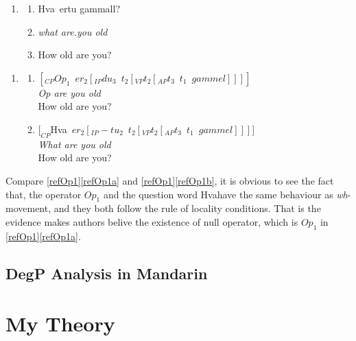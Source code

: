 \documentclass{ctexart}
\begin{document}
\begin{enumerate}[resume]
\item \label{refHva}
\begin{enumerate}
\item Hva\dh$\enspace$ertu gammall? 
\item \textit{what are.you old}
\item How old are you?
\end{enumerate}
\end{enumerate}

\begin{enumerate}[resume]
\item \label{refOp1}
\begin{enumerate}
\item \label{refOp1a} $[_{CP}Op_1 \enspace er_2[_{IP} du_3 \enspace t_2 [_{VP} t_2[_{AP} t_3 \enspace t_1 \enspace gammel]]]]$ \\
\textit{Op are you old} \\
How old are you?
\item \label{refOp1b} $[_{CP}$Hva\dh$\enspace er_2[_{IP} -tu_2 \enspace t_2 [_{VP} t_2[_{AP} t_3 \enspace t_1 \enspace gammel]]]]$ \\
\textit{What are you old} \\
How old are you?
\end{enumerate}
\end{enumerate}

Compare \ref{refOp1}\ref{refOp1a} and \ref{refOp1}\ref{refOp1b}, it is obvious to see the fact that, the operator $Op_1$ and the question word Hva\dh \enspace have the same behaviour as \textit{wh}-movement, and they both follow the rule of locality conditions. That is the evidence makes authors belive the existence of null operator, which is $Op_1$ in \ref{refOp1}\ref{refOp1a}.


\subsection{DegP Analysis in Mandarin}



\section{My Theory}

\newpage

\printbibliography
\end{document}

